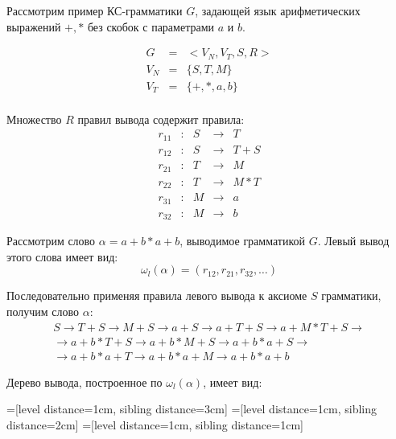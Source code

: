 \documentclass[12pt]{article}
\begin{document}
\begin{footnotesize}
	
Рассмотрим пример КС-грамматики $G$, задающей язык арифметических выражений $+, *$ без скобок с параметрами $a$ и $b$.

\begin{equation}
\begin{array}{lcl}
	G & = & <V_N, V_T, S, R> \\
	V_N & = & \{S, T, M\} \\
	V_T & = & \{+, *, a, b\} \\
\end{array}
\end{equation}

Множество $R$ правил вывода содержит правила:	
\begin{equation}
\begin{array}{lclcl}
	r_{11} & : & S & \rightarrow & T \\
	r_{12} & : & S & \rightarrow & T + S \\
	r_{21} & : & T & \rightarrow & M \\
	r_{22} & : & T & \rightarrow & M * T \\
	r_{31} & : & M & \rightarrow & a \\
	r_{32} & : & M & \rightarrow & b	
\end{array}
\end{equation}

Рассмотрим слово $\alpha = a + b * a + b$, выводимое грамматикой $G$. Левый вывод этого слова имеет вид:
\begin{equation}
	\omega_l(\alpha) = (r_{12}, r_{21}, r_{32}, \ldots)
\end{equation}

Последовательно применяя правила левого вывода к аксиоме $S$ грамматики, получим слово $\alpha$:
\begin{multline}
	S \rightarrow T + S \rightarrow M + S \rightarrow a + S \rightarrow a + T + S \rightarrow a + M * T + S \rightarrow \\
	\rightarrow a + b * T + S \rightarrow a + b * M + S \rightarrow a + b * a + S \rightarrow \\
	\rightarrow a + b * a + T \rightarrow a + b * a + M \rightarrow a + b * a + b
\end{multline}

Дерево вывода, построенное по $\omega_l(\alpha)$, имеет вид:

=[level distance=1cm, sibling distance=3cm]
=[level distance=1cm, sibling distance=2cm]
=[level distance=1cm, sibling distance=1cm]


\end{footnotesize}
\end{document}

